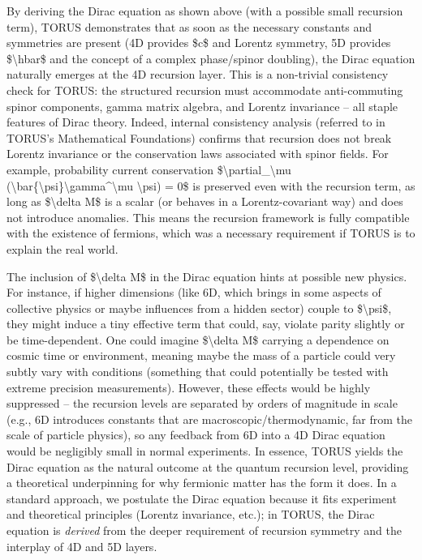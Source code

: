 \documentclass[
]{article}
\begin{document}
By deriving the Dirac equation as shown above (with a possible small
recursion term), TORUS demonstrates that as soon as the necessary
constants and symmetries are present (4D provides \$c\$ and Lorentz
symmetry, 5D provides \$\textbackslash hbar\$ and the concept of a
complex phase/spinor doubling), the Dirac equation naturally emerges at
the 4D recursion layer. This is a non-trivial consistency check for
TORUS: the structured recursion must accommodate anti-commuting spinor
components, gamma matrix algebra, and Lorentz invariance -- all staple
features of Dirac theory. Indeed, internal consistency analysis
(referred to in TORUS's Mathematical Foundations) confirms that
recursion does not break Lorentz invariance or the conservation laws
associated with spinor fields. For example, probability current
conservation \$\textbackslash partial\_\textbackslash mu
(\textbackslash bar\{\textbackslash psi\}\textbackslash gamma\^{}\textbackslash mu
\textbackslash psi) = 0\$ is preserved even with the recursion term, as
long as \$\textbackslash delta M\$ is a scalar (or behaves in a
Lorentz-covariant way) and does not introduce anomalies. This means the
recursion framework is fully compatible with the existence of fermions,
which was a necessary requirement if TORUS is to explain the real world.

The inclusion of \$\textbackslash delta M\$ in the Dirac equation hints
at possible new physics. For instance, if higher dimensions (like 6D,
which brings in some aspects of collective physics or maybe influences
from a hidden sector) couple to \$\textbackslash psi\$, they might
induce a tiny effective term that could, say, violate parity slightly or
be time-dependent. One could imagine \$\textbackslash delta M\$ carrying
a dependence on cosmic time or environment, meaning maybe the mass of a
particle could very subtly vary with conditions (something that could
potentially be tested with extreme precision measurements). However,
these effects would be highly suppressed -- the recursion levels are
separated by orders of magnitude in scale (e.g., 6D introduces constants
that are macroscopic/thermodynamic, far from the scale of particle
physics), so any feedback from 6D into a 4D Dirac equation would be
negligibly small in normal experiments. In essence, TORUS yields the
Dirac equation as the natural outcome at the quantum recursion level,
providing a theoretical underpinning for why fermionic matter has the
form it does. In a standard approach, we postulate the Dirac equation
because it fits experiment and theoretical principles (Lorentz
invariance, etc.); in TORUS, the Dirac equation is \emph{derived} from
the deeper requirement of recursion symmetry and the interplay of 4D and
5D layers.
\end{document}
